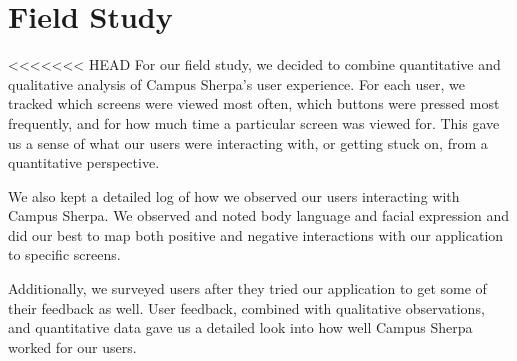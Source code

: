\documentclass{sigchi}
\begin{document}
\section{Field Study}

<<<<<<< HEAD
For our field study, we decided to combine quantitative and qualitative analysis of Campus Sherpa's user experience. For each user, we tracked which screens were viewed most often, which buttons were pressed most frequently, and for how much time a particular screen was viewed for. This gave us a sense of what our users were interacting with, or getting stuck on, from a quantitative perspective.

We also kept a detailed log of how we observed our users interacting with Campus Sherpa. We observed and noted body language and facial expression and did our best to map both positive and negative interactions with our application to specific screens.

Additionally, we surveyed users after they tried our application to get some of their feedback as well. User feedback, combined with qualitative observations, and quantitative data gave us a detailed look into how well Campus Sherpa worked for our users.
\end{document}
